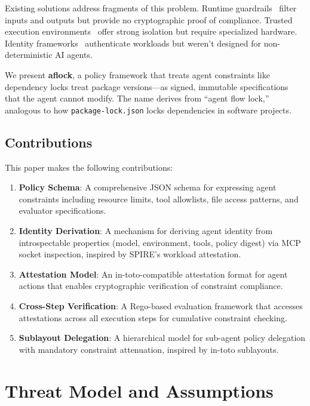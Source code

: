\documentclass[11pt,a4paper]{article}
\begin{document}
Existing solutions address fragments of this problem. Runtime guardrails~\cite{guardrailsai} filter inputs and outputs but provide no cryptographic proof of compliance. Trusted execution environments~\cite{omega2025} offer strong isolation but require specialized hardware. Identity frameworks~\cite{spiffe} authenticate workloads but weren't designed for non-deterministic AI agents.

We present \textbf{aflock}, a policy framework that treats agent constraints like dependency locks treat package versions---as signed, immutable specifications that the agent cannot modify. The name derives from ``agent flow lock,'' analogous to how \texttt{package-lock.json} locks dependencies in software projects.

\subsection{Contributions}

This paper makes the following contributions:

\begin{enumerate}
    \item \textbf{Policy Schema}: A comprehensive JSON schema for expressing agent constraints including resource limits, tool allowlists, file access patterns, and evaluator specifications.

    \item \textbf{Identity Derivation}: A mechanism for deriving agent identity from introspectable properties (model, environment, tools, policy digest) via MCP socket inspection, inspired by SPIRE's workload attestation.

    \item \textbf{Attestation Model}: An in-toto-compatible attestation format for agent actions that enables cryptographic verification of constraint compliance.

    \item \textbf{Cross-Step Verification}: A Rego-based evaluation framework that accesses attestations across all execution steps for cumulative constraint checking.

    \item \textbf{Sublayout Delegation}: A hierarchical model for sub-agent policy delegation with mandatory constraint attenuation, inspired by in-toto sublayouts.
\end{enumerate}

\section{Threat Model and Assumptions}
\end{document}
